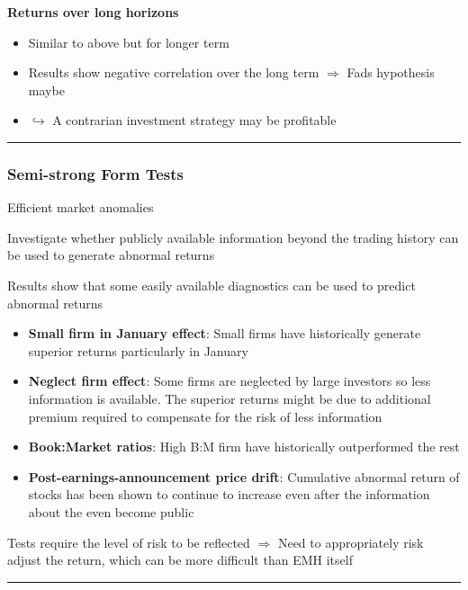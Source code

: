 \documentclass[]{book}
\theoremstyle{definition}
\theoremstyle{definition}
\theoremstyle{remark}
\begin{document}
\textbf{Returns over long horizons}

\begin{itemize}
\item
  Similar to above but for longer term
\item
  Results show negative correlation over the long term \(\Rightarrow\)
  Fads hypothesis maybe
\item
  \(\hookrightarrow\) A contrarian investment strategy may be profitable
\end{itemize}

\begin{center}\rule{0.5\linewidth}{\linethickness}\end{center}

\subsubsection{Semi-strong Form Tests}\label{semi-strong-form-tests}

Efficient market anomalies

Investigate whether publicly available information beyond the trading
history can be used to generate abnormal returns

Results show that some easily available diagnostics can be used to
predict abnormal returns

\begin{itemize}
\item
  \textbf{Small firm in January effect}: Small firms have historically
  generate superior returns particularly in January
\item
  \textbf{Neglect firm effect}: Some firms are neglected by large
  investors so less information is available. The superior returns might
  be due to additional premium required to compensate for the risk of
  less information
\item
  \textbf{Book:Market ratios}: High B:M firm have historically
  outperformed the rest
\item
  \textbf{Post-earnings-announcement price drift}: Cumulative abnormal
  return of stocks has been shown to continue to increase even after the
  information about the even become public
\end{itemize}

Tests require the level of risk to be reflected \(\Rightarrow\) Need to
appropriately risk adjust the return, which can be more difficult than
EMH itself

\begin{center}\rule{0.5\linewidth}{\linethickness}\end{center}
\end{document}
